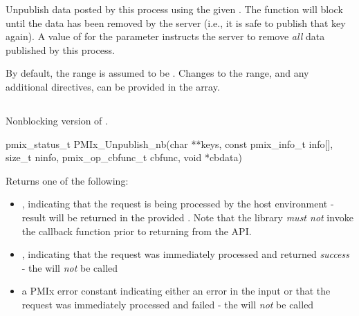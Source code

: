 \descr

Unpublish data posted by this process using the given .
The function will block until the data has been removed by the server (i.e., it is safe to publish that key again).
A value of  for the  parameter instructs the server to remove \emph{all} data published by this process.

By default, the range is assumed to be .
Changes to the range, and any additional directives, can be provided in the  array.


\subsection{}

\summary

Nonblocking version of .

\format

\cspecificstart
\begin{codepar}
pmix_status_t
PMIx_Unpublish_nb(char **keys,
                  const pmix_info_t info[], size_t ninfo,
                  pmix_op_cbfunc_t cbfunc, void *cbdata)
\end{codepar}
\cspecificend

\begin{arglist}
\end{arglist}

Returns one of the following:

\begin{itemize}
    \item {}, indicating that the request is being processed by the host environment - result will be returned in the provided . Note that the library \emph{must not} invoke the callback function prior to returning from the \ac{API}.
    \item {}, indicating that the request was immediately processed and returned \textit{success} - the  will \textit{not} be called
    \item a PMIx error constant indicating either an error in the input or that the request was immediately processed and failed - the  will \textit{not} be called
\end{itemize}

